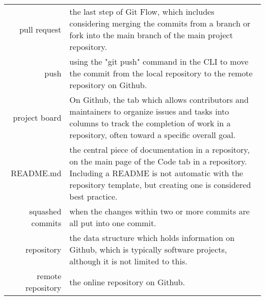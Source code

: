 \begin{center}
\begin{longtable}{r p{}}
pull request & the last step of Git Flow, which includes considering merging the commits from a branch or fork into the main branch of the main project repository. \\

push & using the "git push" \cite{gitdocs} command in the CLI to move the commit from the local repository to the remote repository on Github. \\ 


project board & On Github, the tab which allows contributors and maintainers to organize issues and tasks into columns to track the completion of work in a repository, often toward a specific overall goal. \\

README.md & the central piece of documentation in a repository, on the main page of the Code tab in a repository. Including a README is not automatic with the repository template, but creating one is considered best practice. \\

squashed commits & when the changes within two or more commits are all put into one commit. \\ 

repository & the data structure which holds information on Github, which is typically software projects, although it is not limited to this. \\

remote repository & the online repository on Github. \\

\end{longtable}
\end{center} 